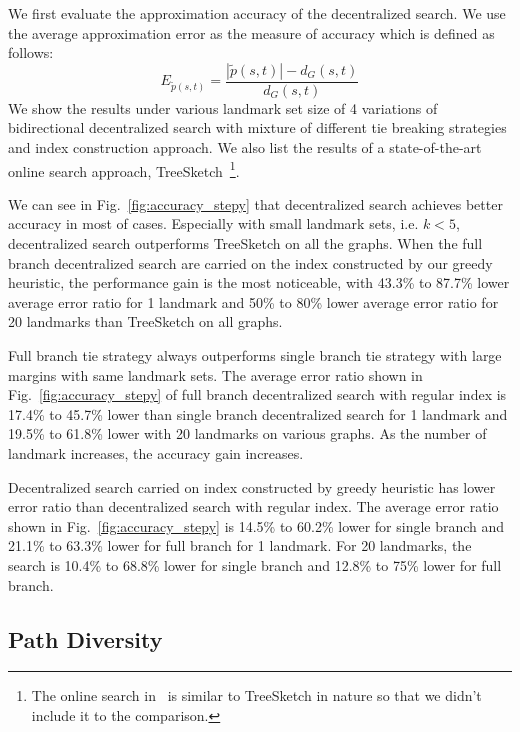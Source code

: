 We first evaluate the approximation accuracy of the decentralized search. We use the average approximation error as the measure of accuracy which is defined as follows:
\[
E_{\tilde{p}(s,t)} = \frac{|\tilde{p}(s,t)| - d_G(s,t)}{d_G(s,t)}
\]
We show the results under various landmark set size of 4 variations of bidirectional decentralized search with mixture of different tie breaking strategies and index construction approach. We also list the results of a state-of-the-art online search approach, TreeSketch~\cite{Gubichev:2010:FAE:1871437.1871503}\footnote{The online search in~\cite{6399472} is similar to TreeSketch in nature so that we didn't include it to the comparison.}. 

We can see in Fig.~\ref{fig:accuracy_stepy} that decentralized search achieves better accuracy in most of cases. Especially with small landmark sets, i.e. $k < 5$, decentralized search outperforms TreeSketch on all the graphs. When the full branch decentralized search are carried on the index constructed by our greedy heuristic, the performance gain is the most noticeable, with 43.3\% to 87.7\% lower average error ratio for 1 landmark and 50\% to 80\% lower average error ratio for 20 landmarks than TreeSketch on all graphs.

Full branch tie strategy always outperforms single branch tie strategy with large margins with same landmark sets. The average error ratio shown in Fig.~\ref{fig:accuracy_stepy} of full branch decentralized search with regular index is 17.4\% to 45.7\% lower than single branch decentralized search for 1 landmark and 19.5\% to 61.8\% lower with 20 landmarks on various graphs. As the number of landmark increases, the accuracy gain increases.   

Decentralized search carried on index constructed by greedy heuristic has lower error ratio than decentralized search with regular index. The average error ratio shown in Fig.~\ref{fig:accuracy_stepy} is 14.5\% to 60.2\% lower for single branch and 21.1\% to 63.3\% lower for full branch for 1 landmark. For 20 landmarks, the search is 10.4\% to 68.8\% lower for single branch and 12.8\% to 75\% lower for full branch.

\subsection{Path Diversity}
\label{eval_diversity}

